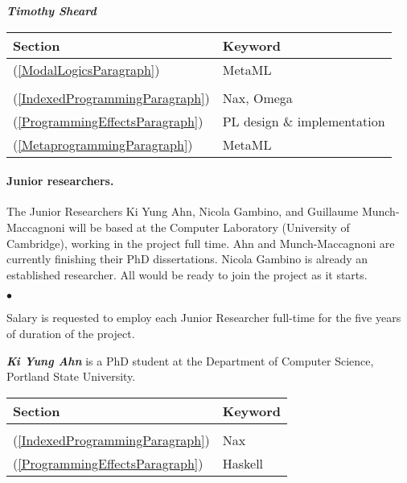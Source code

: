 \documentclass[11pt,twocolumn]{article}
\newenvironment{myitemize}
  {\begin{list}{$\bullet$}
  {\setlength{\topsep}{2pt}
   \setlength{\partopsep}{2pt}
   \setlength{\itemsep}{2.5pt}
   \setlength{\parsep}{2.5pt}
   \setlength{\leftmargin}{1em}
   \setlength{\labelwidth}{.5em}}}
  {\end{list}}
\begin{document}
\smallskip\noindent
\textbf{\em Timothy Sheard}

\begin{tabular}{l|l}
Section & Keyword
\\\hline
(\ref{ModalLogicsParagraph}) & MetaML
\\
\\
(\ref{IndexedProgrammingParagraph}) & Nax, Omega
\\
(\ref{ProgrammingEffectsParagraph}) & PL design \& implementation
\\
(\ref{MetaprogrammingParagraph}) & MetaML
\\
\end{tabular}

\paragraph*{Junior researchers.}

The Junior Researchers Ki Yung Ahn, Nicola Gambino, and Guillaume
Munch-Maccagnoni will be based at the Computer Laboratory (University of
Cambridge), working in the project full time.  Ahn and Munch-Maccagnoni
are currently finishing their PhD dissertations.  Nicola Gambino is
already an established researcher.  All would be ready to join the project
as it starts.  
\begin{myitemize}
\item 
  Salary is requested to employ each Junior Researcher full-time for the five
  years of duration of the project.
\end{myitemize}

\smallskip\noindent
\textbf{\em Ki Yung Ahn}
is a PhD student at the Department of Computer Science, Portland State
University.

\begin{tabular}{l|l}
Section & Keyword
\\\hline
\\
(\ref{IndexedProgrammingParagraph}) & Nax
\\
(\ref{ProgrammingEffectsParagraph}) & Haskell
\\
\end{tabular}
\end{document}
